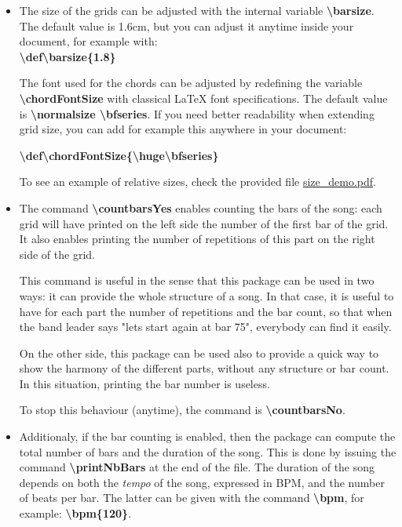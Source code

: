 \documentclass[11pt]{article}
\newcommand{\btt}{\bfseries \ttfamily }
\newcommand{\tbs}{\textbackslash{}}
\begin{document}
\begin{itemize}

\item The size of the grids can be adjusted with the internal variable 
{\btt \tbs barsize}.
The default value is 1.6cm, but you can adjust it anytime inside your document, for example with:\\
{\btt \tbs def\tbs barsize\{1.8\}}

The font used for the chords can be adjusted by redefining the variable {\btt \tbs chordFontSize} with classical \LaTeX{} font specifications.
The default value is {\btt \tbs normalsize \tbs bfseries}.
If you need better readability when extending grid size, you can add for example this anywhere in your document:

{\btt \tbs def\tbs chordFontSize\{\tbs huge\tbs bfseries\}}

To see an example of relative sizes, check the provided file \href{https://github.com/skramm/chordbars/raw/master/size_demo.pdf}{size\_demo.pdf}.

\item The command {\btt \tbs countbarsYes} enables counting the bars of the song:
each grid will have printed on the left side the number of the first bar of the grid.
It also enables printing the number of repetitions of this part on the right side of the grid.

This command is useful in the sense that this package can be used in two ways:
it can provide the whole structure of a song.
In that case, it is useful to have for each part the number of repetitions and the bar count, so that when the band leader says "lets start again at bar 75", everybody can find it easily.

On the other side, this package can be used also to provide a quick way to show the harmony of the different parts, without any structure or bar count.
In this situation, printing the bar number is useless.

To stop this behaviour (anytime), the command is {\btt \tbs countbarsNo}.

\item Additionaly, if the bar counting is enabled, then the package can compute the total number of bars and the duration of the song.
This is done by issuing the command {\btt \tbs printNbBars} at the end of the file.
The duration of the song depends on both the {\em tempo} of the song, expressed in BPM, and the number of beats per bar.
The latter can be given with the command {\btt \tbs bpm}, for example:
{\btt \tbs bpm\{120\}}.


\end{itemize}
\end{document}
